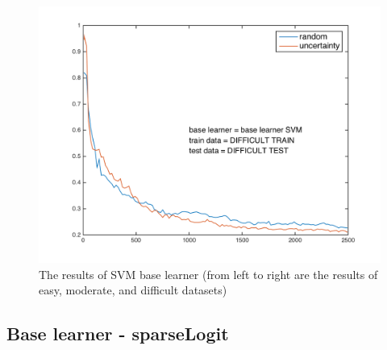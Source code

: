 \documentclass{article}
\begin{document}
\begin{figure}[!ht]
\begin{minipage}{.31\textwidth}
    \end{minipage}
    \hfill
    \centering
    \begin{minipage}{.31\textwidth}
      \centering
      \includegraphics[width=1\linewidth]{../svm_difficult}
    \end{minipage}
    \caption{The results of SVM base learner (from left to right are the results of easy, moderate, and difficult datasets)}
    \label{fig:svm}
  \end{figure}

\subsection{Base learner - sparseLogit}
\end{document}
